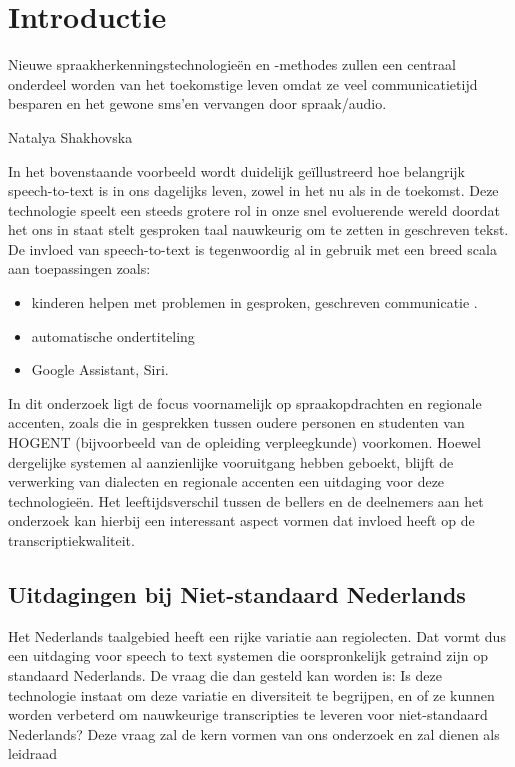 \section{Introductie}%
\label{sec:introductie}
\epigraph{Nieuwe spraakherkenningstechnologieën en -methodes zullen een centraal onderdeel worden van het toekomstige leven omdat ze veel communicatietijd besparen en het gewone sms'en vervangen door spraak/audio.}{Natalya Shakhovska}

In het bovenstaande voorbeeld wordt duidelijk geïllustreerd hoe belangrijk speech-to-text is in ons dagelijks leven, zowel in het nu als in de toekomst. Deze technologie speelt een steeds grotere rol in onze snel evoluerende wereld doordat het ons in staat stelt gesproken taal nauwkeurig om te zetten in geschreven tekst. De invloed van speech-to-text is tegenwoordig al in gebruik met een breed scala aan toepassingen zoals:
\begin{itemize}
    \item kinderen helpen met problemen in gesproken, geschreven communicatie \cite{Kambouri2023}.
    \item automatische ondertiteling
    \item Google Assistant, Siri.
\end{itemize}

In dit onderzoek ligt de focus voornamelijk op spraakopdrachten en regionale accenten, zoals die in gesprekken tussen oudere personen en studenten van HOGENT (bijvoorbeeld van de opleiding verpleegkunde) voorkomen. Hoewel dergelijke systemen al aanzienlijke vooruitgang hebben geboekt, blijft de verwerking van dialecten en regionale accenten een uitdaging voor deze technologieën. Het leeftijdsverschil tussen de bellers en de deelnemers aan het onderzoek kan hierbij een interessant aspect vormen dat invloed heeft op de transcriptiekwaliteit.

\subsection{Uitdagingen bij Niet-standaard Nederlands}
Het Nederlands taalgebied heeft een rijke variatie aan regiolecten. Dat vormt dus een uitdaging voor speech to text systemen die oorspronkelijk getraind zijn op standaard Nederlands. De vraag die dan gesteld kan worden is: Is deze technologie instaat om deze variatie en diversiteit te begrijpen, en of ze kunnen worden verbeterd om nauwkeurige transcripties te leveren voor niet-standaard Nederlands?
Deze vraag zal de kern vormen van ons onderzoek en zal dienen als leidraad

